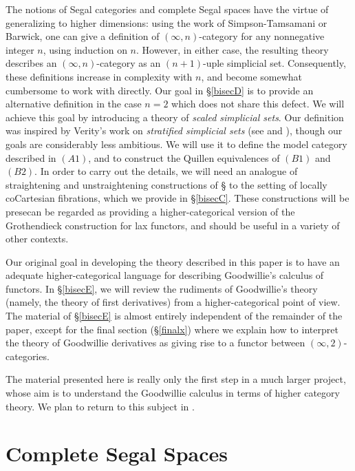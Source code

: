 The notions of Segal categories and complete Segal spaces have the virtue of generalizing
to higher dimensions: using the work of Simpson-Tamsamani or Barwick, one can give a definition of $(\infty,n)$-category for any nonnegative integer $n$, using induction on $n$. However, in
either case, the resulting theory describes an $(\infty,n)$-category as an $(n+1)$-uple simplicial set.
Consequently, these definitions increase in complexity with $n$, and become somewhat cumbersome
to work with directly. Our goal in \S \ref{bisecD} is to provide an alternative definition in the case
$n=2$ which does not share this defect. We will achieve this goal by introducing a theory of {\it scaled simplicial sets}. Our definition was inspired by Verity's work on {\it stratified simplicial sets} (see \cite{verity} and \cite{verity2}), though our goals are considerably less ambitious. We will use it to define the model category
described in $(A1)$, and to construct the Quillen equivalences of $(B1)$ and $(B2)$. In order
to carry out the details, we will need an analogue of straightening and
unstraightening constructions of \S {} to the setting of locally coCartesian fibrations,
which we provide in \S \ref{bisecC}. These constructions will be presecan be regarded as providing a higher-categorical version of the Grothendieck construction for lax functors, and should be useful in a variety of other contexts.

Our original goal in developing the theory described in this paper is to have an adequate higher-categorical language for describing Goodwillie's calculus of functors. In \S \ref{bisecE}, we will review the rudiments of Goodwillie's theory (namely, the theory of first derivatives) from a higher-categorical point of view. The material of \S \ref{bisecE} is almost entirely independent of the remainder of the paper, except for the final section (\S \ref{finalx}) where we explain how to interpret
the theory of Goodwillie derivatives as giving rise to a functor between $(\infty,2)$-categories.

\begin{remark}
The material presented here is really only the first step in a much larger project,
whose aim is to understand the Goodwillie calculus in terms of higher category theory.
We plan to return to this subject in \cite{calculus}.
\end{remark}

\section{Complete Segal Spaces}\label{bisecA}

